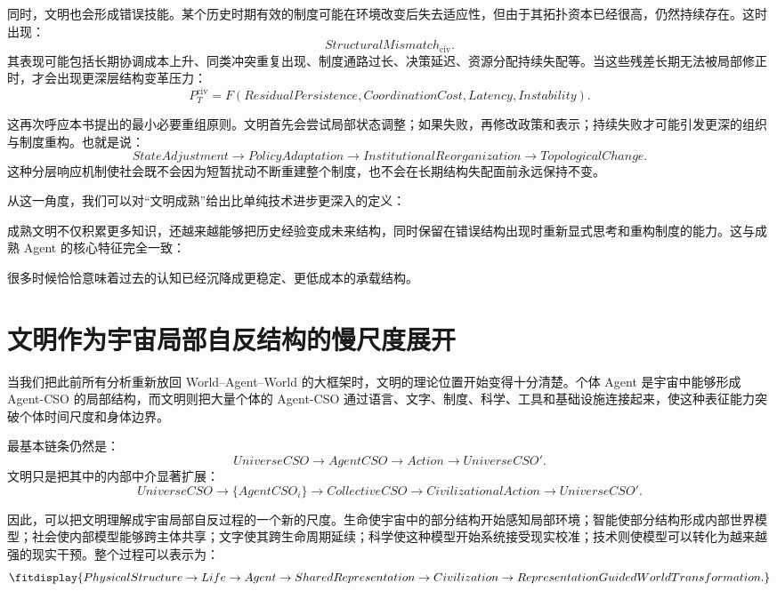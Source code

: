 同时，文明也会形成错误技能。某个历史时期有效的制度可能在环境改变后失去适应性，但由于其拓扑资本已经很高，仍然持续存在。这时出现：
\[
StructuralMismatch_{\mathrm{civ}}.
\]
其表现可能包括长期协调成本上升、同类冲突重复出现、制度通路过长、决策延迟、资源分配持续失配等。当这些残差长期无法被局部修正时，才会出现更深层结构变革压力：
\[
P_T^{\mathrm{civ}}
=
F(
ResidualPersistence,
CoordinationCost,
Latency,
Instability
).
\]

这再次呼应本书提出的最小必要重组原则。文明首先会尝试局部状态调整；如果失败，再修改政策和表示；持续失败才可能引发更深的组织与制度重构。也就是说：
\[
StateAdjustment
\rightarrow
PolicyAdaptation
\rightarrow
InstitutionalReorganization
\rightarrow
TopologicalChange.
\]
这种分层响应机制使社会既不会因为短暂扰动不断重建整个制度，也不会在长期结构失配面前永远保持不变。

从这一角度，我们可以对“文明成熟”给出比单纯技术进步更深入的定义：
\begin{statementbox}
\centering
{}
\end{statementbox}
成熟文明不仅积累更多知识，还越来越能够把历史经验变成未来结构，同时保留在错误结构出现时重新显式思考和重构制度的能力。这与成熟 Agent 的核心特征完全一致：
\begin{statementbox}
\centering
{}
\end{statementbox}
很多时候恰恰意味着过去的认知已经沉降成更稳定、更低成本的承载结构。

\section{文明作为宇宙局部自反结构的慢尺度展开}

当我们把此前所有分析重新放回 World--Agent--World 的大框架时，文明的理论位置开始变得十分清楚。个体 Agent 是宇宙中能够形成 Agent-CSO 的局部结构，而文明则把大量个体的 Agent-CSO 通过语言、文字、制度、科学、工具和基础设施连接起来，使这种表征能力突破个体时间尺度和身体边界。

最基本链条仍然是：
\[
UniverseCSO
\rightarrow
AgentCSO
\rightarrow
Action
\rightarrow
UniverseCSO'.
\]
文明只是把其中的内部中介显著扩展：
\[
UniverseCSO
\rightarrow
\{AgentCSO_i\}
\rightarrow
CollectiveCSO
\rightarrow
CivilizationalAction
\rightarrow
UniverseCSO'.
\]

因此，可以把文明理解成宇宙局部自反过程的一个新的尺度。生命使宇宙中的部分结构开始感知局部环境；智能使部分结构形成内部世界模型；社会使内部模型能够跨主体共享；文字使其跨生命周期延续；科学使这种模型开始系统接受现实校准；技术则使模型可以转化为越来越强的现实干预。整个过程可以表示为：
\[
\fitdisplay{
PhysicalStructure
\rightarrow
Life
\rightarrow
Agent
\rightarrow
SharedRepresentation
\rightarrow
Civilization
\rightarrow
RepresentationGuidedWorldTransformation.
}
\]

